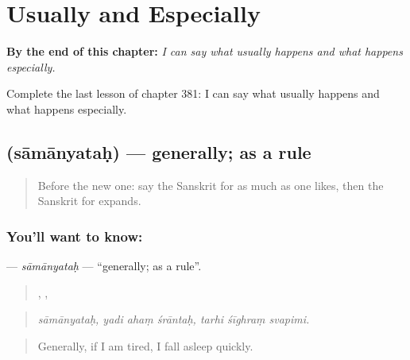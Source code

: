 
\chapter{Usually and Especially}
\label{ch:sa-usually-and-especially}

\begin{chapteropening}
\textbf{By the end of this chapter:} \emph{I can say what usually happens and what happens especially.}

Complete the last lesson of chapter 381: I can say what usually happens and what happens especially.
\end{chapteropening}

\section[\texorpdfstring{\sk{सामान्यतः} (sāmānyataḥ)}{सामान्यतः (sāmānyataḥ)}]{ (sāmānyataḥ) — generally; as a rule}

\label{lesson:SA-C381-samanyatah}



\begin{quote}
Before the new one: say the Sanskrit for as much as one likes, then the Sanskrit for expands.
\end{quote}

\subsection*{You'll want to know: }
\textbf{} — \emph{sāmānyataḥ} — \textquotedblleft{}generally; as a rule\textquotedblright{}.

\begin{quote}
,   ,   
\end{quote}

\begin{quote}
\emph{sāmānyataḥ, yadi ahaṃ śrāntaḥ, tarhi śīghraṃ svapimi.}
\end{quote}

\begin{quote}
Generally, if I am tired, I fall asleep quickly.
\end{quote}

